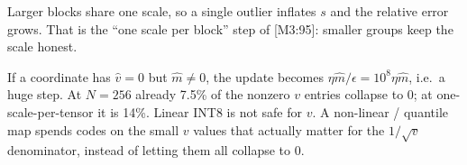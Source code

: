 \documentclass[11pt]{article}
\begin{document}
Larger blocks share one scale, so a single outlier inflates \(s\) and
the relative error grows. That is the ``one scale per block'' step of
[M3:95]: smaller groups keep the scale honest.

If a coordinate has \(\hat v=0\) but \(\hat m\neq 0\), the update
becomes \(\eta\hat m/\epsilon=10^8\eta\hat m\), i.e.\ a huge step.
At \(N=256\) already 7.5\% of the nonzero \(v\) entries collapse to
0; at one-scale-per-tensor it is 14\%. Linear INT8 is not safe for
\(v\). A non-linear / quantile map spends codes on the small \(v\)
values that actually matter for the \(1/\sqrt{v}\) denominator,
instead of letting them all collapse to 0.
\end{document}
